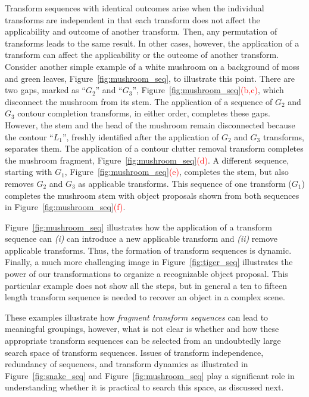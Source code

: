 Transform sequences with identical outcomes arise when the individual transforms are independent in that each transform does not affect the applicability and outcome of another transform. Then, any permutation of transforms leads to the same result. In other cases, however, the application of a transform can affect the applicability or the outcome of another transform. Consider another simple example of a white mushroom on a background of moss and green leaves, Figure~\ref{fig:mushroom_seq}, to illustrate this point. There are two gaps, marked as ``$G_2$'' and ``$G_3$'', Figure~\ref{fig:mushroom_seq}\textcolor{red}{(b,c)}, which disconnect the mushroom from its stem. The application of a sequence of $G_2$ and $G_3$ contour completion transforms, in either order, completes these gaps. However, the stem and the head of the mushroom remain disconnected because the contour ``$L_1$'', freshly identified after the application of $G_2$ and $G_3$ transforms, separates them. The application of a contour clutter removal transform completes the mushroom fragment, Figure~\ref{fig:mushroom_seq}\textcolor{red}{(d)}. A different sequence, starting with $G_1$, Figure~\ref{fig:mushroom_seq}\textcolor{red}{(e)}, completes the stem, but also removes $G_2$ and $G_3$ as applicable transforms. This sequence of one transform ($G_1$) completes the mushroom stem with object proposals shown from both sequences in Figure~\ref{fig:mushroom_seq}\textcolor{red}{(f)}. 


Figure~\ref{fig:mushroom_seq} illustrates how the application of a transform sequence can \emph{(i)} can introduce a new applicable transform and \emph{(ii)} remove applicable transforms. Thus, the formation of transform sequences is dynamic.  Finally, a much more challenging image in Figure~\ref{fig:tiger_seq} illustrates the power of our transformations to organize a recognizable object proposal. This particular example does not show all the steps, but in general a ten to fifteen length transform sequence is needed to recover an object in a complex scene.
 
These examples illustrate how \emph{fragment transform sequences} can lead to meaningful groupings, however, what is not clear is whether and how these appropriate transform sequences can be selected from an undoubtedly large search space of transform sequences. Issues of transform independence, redundancy of sequences, and transform dynamics as illustrated in Figure~\ref{fig:snake_seq} and Figure~\ref{fig:mushroom_seq} play a significant role in understanding whether it is practical to search this space, as discussed next. 
  

